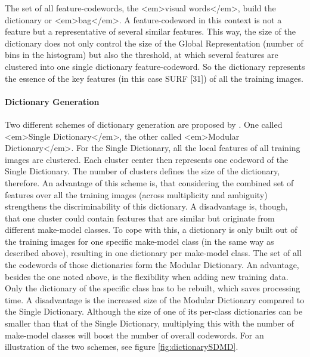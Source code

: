 The set of all feature-codewords, the <em>visual words</em>, build the dictionary or <em>bag</em>. A feature-codeword in this context is not a feature but a representative of several similar features. This way, the size of the dictionary does not only control the size of the Global Representation (number of bins in the histogram) but also the threshold, at which several features are clustered into one single dictionary feature-codeword. So the dictionary represents the essence of the key features (in this case SURF [31]) of all the training images.

\paragraph{Dictionary Generation}
Two different schemes of dictionary generation are proposed by \citeauthor{siddiqui2015robust}. One called <em>Single Dictionary</em>, the other called <em>Modular Dictionary</em>. For the Single Dictionary, all the local features of all training images are clustered. Each cluster center then represents one codeword of the Single Dictionary. The number of clusters defines the size of the dictionary, therefore. An advantage of this scheme is, that considering the combined set of features over all the training images (across multiplicity and ambiguity) strengthens the discriminability of this dictionary. A disadvantage is, though, that one cluster could contain features that are similar but originate from different make-model classes. To cope with this, a dictionary is only built out of the training images for one specific make-model class (in the same way as described above), resulting in one dictionary per make-model class. The set of all the codewords of those dictionaries form the Modular Dictionary. An advantage, besides the one noted above, is the flexibility when adding new training data. Only the dictionary of the specific class has to be rebuilt, which saves processing time. A disadvantage is the increased size of the Modular Dictionary compared to the Single Dictionary. Although the size of one of its per-class dictionaries can be smaller than that of the Single Dictionary, multiplying this with the number of make-model classes will boost the number of overall codewords. For an illustration of the two schemes, see figure \ref{fig:dictionarySDMD}.

